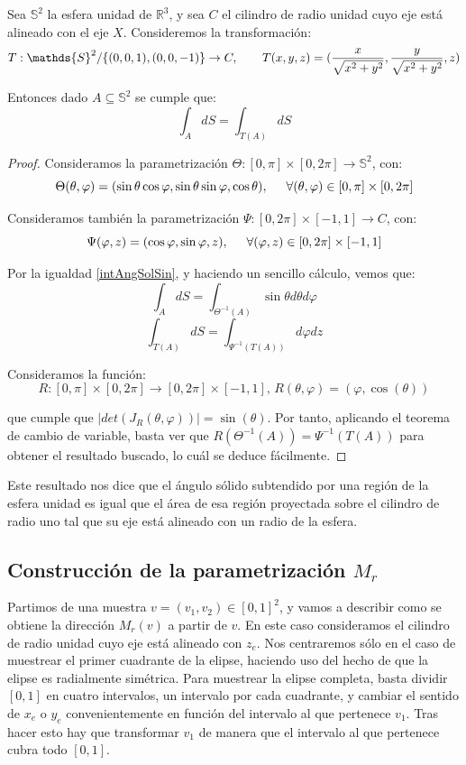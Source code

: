 \begin{proposicion}
Sea $\mathds{S}^2$ la esfera unidad de $\mathds{R}^3$, y sea $C$ el cilindro de radio unidad cuyo eje está alineado con el eje $X$. Consideremos la transformación:
$$T:\mathds{S}^2/\{(0,0,1),(0,0,-1)\}\rightarrow C, \hspace{0.7cm} T(x,y,z) = (\frac{x}{\sqrt{x^2+y^2}}, \frac{y}{\sqrt{x^2+y^2}}, z)$$

Entonces dado $A\subseteq\mathds{S}^2$ se cumple que:
$$\int_A dS = \int_{T(A)} dS$$
\end{proposicion}
\begin{proof}
Consideramos la parametrización $\Theta:[0,\pi ]\times [0,2\pi ]\rightarrow \mathds{S}^2$, con:
$$\Theta(\theta ,\varphi ) = ( \sin \theta \cos \varphi,  \sin \theta \sin \varphi , \cos \theta),\hspace{0.5cm}  \forall (\theta , \varphi)\in [0,\pi ]\times [0,2\pi ]$$

Consideramos también la parametrización $\Psi:[0,2\pi ]\times [-1,1]\rightarrow C$, con:
$$\Psi(\varphi , z ) = (\cos \varphi,  \sin \varphi , z),\hspace{0.5cm}  \forall (\varphi, z)\in [0,2\pi ]\times [-1,1]$$

Por la igualdad \ref{intAngSolSin}, y haciendo un sencillo cálculo, vemos que:
$$\int_A dS = \int_{\Theta^{-1}(A)} \sin\theta d\theta d\varphi$$
$$\int_{T(A)} dS = \int_{\Psi^{-1}(T(A))} d\varphi dz $$

Consideramos la función:
$$R:[0,\pi]\times [0,2\pi]\rightarrow [0,2\pi]\times [-1,1] \text{, } R(\theta,\varphi) = (\varphi, \cos(\theta))$$

que cumple que $|det(J_R(\theta,\varphi))| = \sin(\theta)$. Por tanto, aplicando el teorema de cambio de variable, basta ver que $R(\Theta^{-1}(A)) = \Psi^{-1}(T(A))$ para obtener el resultado buscado, lo cuál se deduce fácilmente.
\end{proof}

Este resultado nos dice que el ángulo sólido subtendido por una región de la esfera unidad es igual que el área de esa región proyectada sobre el cilindro de radio uno tal que su eje está alineado con un radio de la esfera.

\subsection{Construcción de la parametrización $M_r$}
Partimos de una muestra $v=(v_1,v_2)\in[0,1]^2$, y vamos a describir como se obtiene la dirección $M_r(v)$ a partir de $v$. En este caso consideramos el cilindro de radio unidad cuyo eje está alineado con $z_e$. Nos centraremos sólo en el caso de muestrear el primer cuadrante de la elipse, haciendo uso del hecho de que la elipse es radialmente simétrica. Para muestrear la elipse completa, basta dividir $[0,1]$ en cuatro intervalos, un intervalo por cada cuadrante, y cambiar el sentido de $x_e$ o $y_e$ convenientemente en función del intervalo al que pertenece $v_1$. Tras hacer esto hay que transformar $v_1$ de manera que el intervalo al que pertenece cubra todo $[0,1]$.

